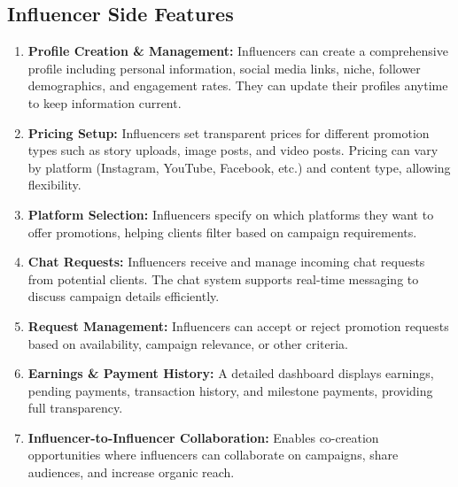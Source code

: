 \begin{justify}
\subsection{Influencer Side Features}
\begin{enumerate}
    \item \textbf{Profile Creation & Management:} Influencers can create a comprehensive profile including personal information, social media links, niche, follower demographics, and engagement rates. They can update their profiles anytime to keep information current.
    \item \textbf{Pricing Setup:} Influencers set transparent prices for different promotion types such as story uploads, image posts, and video posts. Pricing can vary by platform (Instagram, YouTube, Facebook, etc.) and content type, allowing flexibility.
    \item	\textbf{Platform Selection:} Influencers specify on which platforms they want to offer promotions, helping clients filter based on campaign requirements.
    \item 	\textbf{Chat Requests:} Influencers receive and manage incoming chat requests from potential clients. The chat system supports real-time messaging to discuss campaign details efficiently.
    \item \textbf{Request Management:} Influencers can accept or reject promotion requests based on availability, campaign relevance, or other criteria.
    \item \textbf{Earnings & Payment History:} A detailed dashboard displays earnings, pending payments, transaction history, and milestone payments, providing full transparency.
    \item 	\textbf{Influencer-to-Influencer Collaboration:} Enables co-creation opportunities where influencers can collaborate on campaigns, share audiences, and increase organic reach.
\end{enumerate}

\end{justify}
